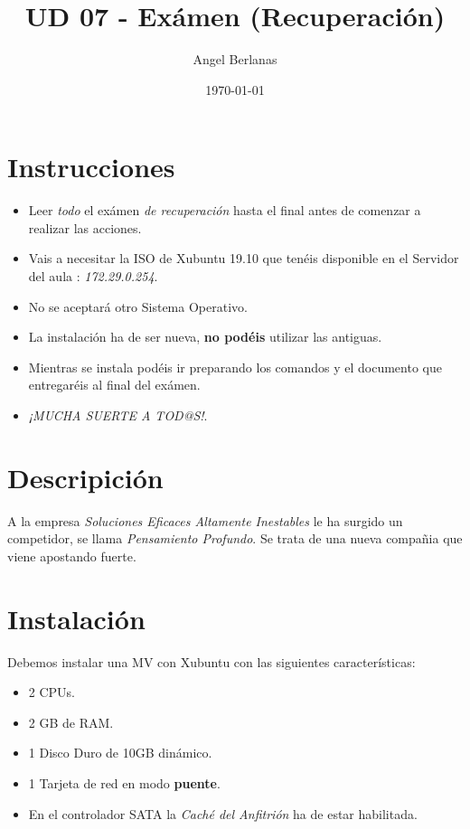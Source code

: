 \documentclass[11pt]{article}
\author{Angel Berlanas}
\date{\today}
\title{UD 07 - Exámen (Recuperación)}
\begin{document}
\maketitle
\tableofcontents


\section{Instrucciones}
\label{sec:org4b4eb24}

\begin{itemize}
\item Leer \emph{todo} el exámen \emph{de recuperación} hasta el final antes de comenzar a realizar las
acciones.
\item Vais a necesitar la ISO de Xubuntu 19.10 que tenéis disponible en el
Servidor del aula : \emph{172.29.0.254}.
\item No se aceptará otro Sistema Operativo.
\item La instalación ha de ser nueva, \textbf{no podéis} utilizar las antiguas.
\item Mientras se instala podéis ir preparando los comandos y el documento que
entregaréis al final del exámen.
\item \emph{¡MUCHA SUERTE A TOD@S!}.
\end{itemize}

\section{Descripición}
\label{sec:org829d3f5}

A la empresa \emph{Soluciones Eficaces Altamente Inestables} le ha surgido un
competidor, se llama \emph{Pensamiento Profundo}. Se trata de una nueva compañia
que viene apostando fuerte.

\section{Instalación}
\label{sec:orgfe3b6fd}

Debemos instalar una MV con Xubuntu con las siguientes características:

\begin{itemize}
\item 2 CPUs.
\item 2 GB de RAM.
\item 1 Disco Duro de 10GB dinámico.
\item 1 Tarjeta de red en modo \textbf{puente}.
\item En el controlador SATA la \emph{Caché del Anfitrión} ha de estar habilitada.
\end{itemize}
\end{document}
